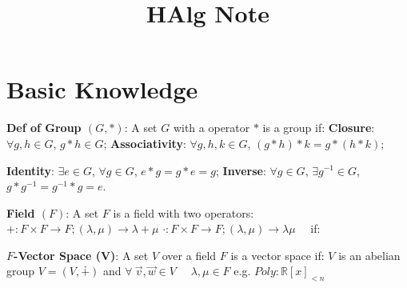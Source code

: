 \documentclass[9pt]{article}
\title{HAlg Note}
\author{}
\date{}
\begin{document}
\newcommand{\bij}{\stackrel{\sim}{\to}}
\newcommand{\oto}{\hookrightarrow}
\newcommand{\onto}{\twoheadrightarrow}

\newcommand{\np}{{\tiny $^{^{^\ominus}}$}}

\maketitle
\thispagestyle{fancy}
\vspace{-3.5cm}

\fontsize{10pt}{11pt}\selectfont
\setlength{\parindent}{8pt}


\section{Basic Knowledge} %

\textbf{Def of Group $(G,*)$}: {\small A set $G$ with a operator $*$ is a group if: \textbf{Closure}: $\forall g,h\in G$, $g*h\in G$; \textbf{Associativity}: $\forall g,h,k\in G$, $(g*h)*k=g*(h*k)$;}

\hspace{85pt} {\small \textbf{Identity}: $\exists e\in G$, $\forall g\in G$, $e*g=g*e=g$; \textbf{Inverse}: $\forall g\in G$, $\exists g^{-1}\in G$, $g*g^{-1}=g^{-1}*g=e$.} 

\textbf{Field $(F)$}: {\small A set $F$ is a field with two operators: $+:F\times F\to F;(\lambda,\mu)\to\lambda+\mu$ $\cdot:F\times F\to F;(\lambda,\mu)\to\lambda\mu$ \ \ if:}

\quad \quad \quad {}

\textbf{$F$-Vector Space (V)}: {\small A set $V$ over a field $F$ is a vector space if: \quad $V$ is an abelian group $V=(V,\dotplus)$ and $\forall \ \vec{v},\vec{w}\in V$ \ \ $\lambda,\mu\in F$} \quad e.g. $Poly:\mathbb{R}[x]_{<n}$

\quad \quad \quad {}
\end{document}
